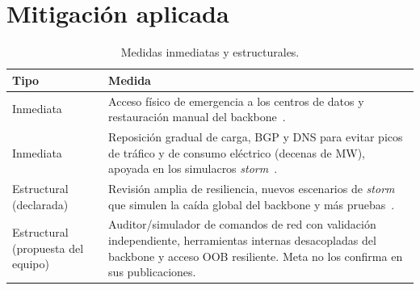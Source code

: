 \documentclass[10pt,a4paper]{article}
\begin{document}
\section{Mitigación aplicada}
\begin{table}[h]
\centering\footnotesize
\caption{Medidas inmediatas y estructurales.}\label{tab:mitiga}
\begin{tabularx}{\columnwidth}{@{}l X@{}}
\toprule
\textbf{Tipo} & \textbf{Medida}\\\midrule
Inmediata & Acceso físico de emergencia a los centros de datos y restauración manual del backbone~\cite{janardhan2021outage}.\\
Inmediata & Reposición gradual de carga, BGP y DNS para evitar picos de tráfico y de consumo eléctrico (decenas de MW), apoyada en los simulacros \textit{storm}~\cite{janardhan2021outage}.\\
Estructural (declarada) & Revisión amplia de resiliencia, nuevos escenarios de \textit{storm} que simulen la caída global del backbone y más pruebas~\cite{janardhan2021outage}.\\
Estructural (propuesta del equipo) & Auditor/simulador de comandos de red con validación independiente, herramientas internas desacopladas del backbone y acceso OOB resiliente. Meta no los confirma en sus publicaciones.\\
\bottomrule
\end{tabularx}
\end{table}
\end{document}
